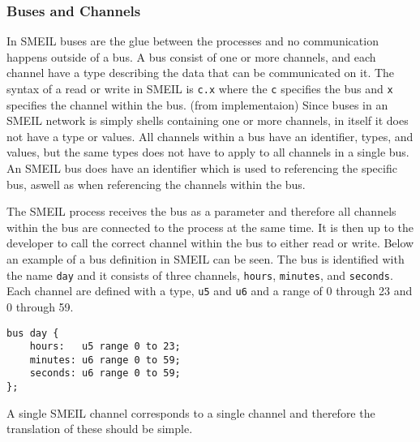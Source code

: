 \subsubsection{Buses and Channels}
In SMEIL buses are the glue between the processes and no communication happens outside of a bus. A bus consist of one or more channels, and each channel have a type describing the data that can be communicated on it.
The syntax of a read or write in SMEIL is \texttt{c.x} where the \texttt{c} specifies the bus and \texttt{x} specifies the channel within the bus.
(from implementaion)
Since buses in an SMEIL network is simply shells containing one or more channels, in itself it does not have a type or values. All channels within a bus have an identifier, types, and values, but the same types does not have to apply to all channels in a single bus. An SMEIL bus does have an identifier which is used to referencing the specific bus, aswell as when referencing the channels within the bus.

The SMEIL process receives the bus as a parameter and therefore all channels within the bus are connected to the process at the same time. It is then up to the developer to call the correct channel within the bus to either read or write.
Below an example of a bus definition in SMEIL can be seen. The bus is identified with the name \texttt{day} and it consists of three channels, \texttt{hours}, \texttt{minutes}, and \texttt{seconds}. Each channel are defined with a type, \texttt{u5} and \texttt{u6} and a range of 0 through 23 and 0 through 59.
\begin{verbatim}
bus day {
    hours:   u5 range 0 to 23;
    minutes: u6 range 0 to 59;
    seconds: u6 range 0 to 59;
};
\end{verbatim}

A single SMEIL channel corresponds to a single \cspm{} channel and therefore the translation of these should be simple.
